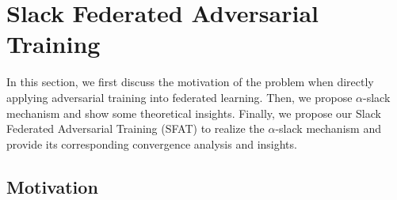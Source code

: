 \documentclass{article} %
\theoremstyle{plain}
\theoremstyle{definition}
\theoremstyle{remark}
\begin{document}

\section{Slack Federated Adversarial Training}

In this section, we first discuss the motivation of the problem when directly applying adversarial training into federated learning. Then, we propose $\alpha$-slack mechanism and show some theoretical insights. Finally, we propose our Slack Federated Adversarial Training (SFAT) to realize the $\alpha$-slack mechanism and provide its corresponding convergence analysis and insights.


\subsection{Motivation}
\label{sec:motivation}
\end{document}
